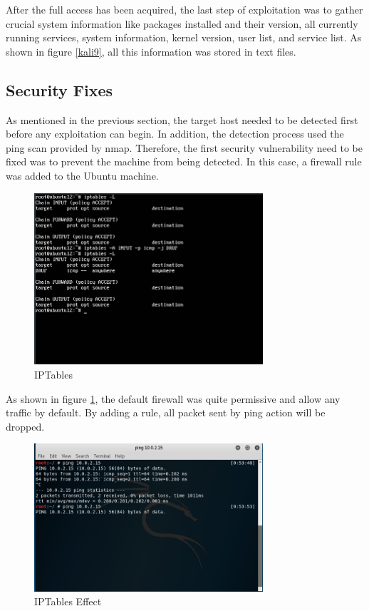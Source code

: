 \documentclass{article}
\begin{document}
After the full access has been acquired, the last step of exploitation was to gather crucial system information 
like packages installed and their version, all currently running services, system information, kernel version, 
user list, and service list.
As shown in figure \ref{kali9}, all this information was stored in text files.


\subsection{Security Fixes}
As mentioned in the previous section, the target host needed to be detected first before any exploitation can begin.
In addition, the detection process used the ping scan provided by nmap. Therefore, the first security vulnerability 
need to be fixed was to prevent the machine from being detected. In this case, a firewall rule was added to the Ubuntu 
machine.

\begin{figure}[H]
  \includegraphics[width=8.5cm]{ubuntu4}
  \caption{IPTables}
  \label{ubuntu4}
\end{figure}

As shown in figure \ref{ubuntu4}, the default firewall was quite permissive and allow any traffic by default. 
By adding a rule, all packet sent by ping action will be dropped. 

\begin{figure}[H]
  \includegraphics[width=8.5cm]{kali10}
  \caption{IPTables Effect}
  \label{kali10}
\end{figure}
\end{document}
